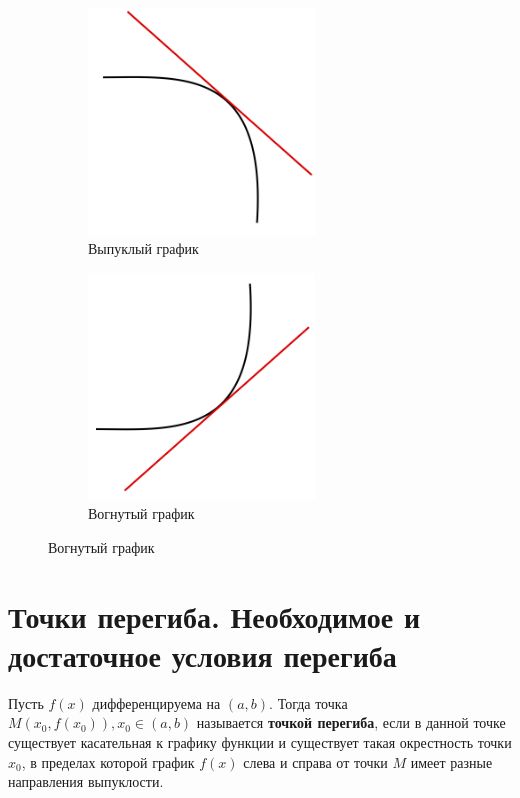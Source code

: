 \documentclass[a4paper,12pt,oneside]{extbook}
\theoremstyle{numbered}
\theoremstyle{unnumbered}
\theoremstyle{named}
\theoremstyle{unnumbered}
\theoremstyle{named}
\theoremstyle{named}
\theoremstyle{named}
\begin{document}
\begin{figure}[h]
    \begin{subfigure}{0.5\textwidth}
        \includegraphics[width=0.9\linewidth, height=6cm]{convex.png}
        \caption*{Выпуклый график}
    \end{subfigure}
    \begin{subfigure}{0.5\textwidth}
        \includegraphics[width=0.9\linewidth, height=6cm]{concave.png}
        \caption*{Вогнутый график}
    \end{subfigure}
\end{figure}

\section{Точки перегиба. Необходимое и достаточное условия перегиба}%
\label{sec:Точки перегиба. Необходимое и достаточное условия перегиба}

\begin{siderules}
    Пусть \(f(x)\) дифференцируема на \((a, b)\). Тогда точка \(M(x_0, f(x_0)), x_0 \in (a, b)\) называется \textbf{точкой перегиба}, если в данной точке существует касательная к графику функции и существует такая окрестность точки \(x_0\), в пределах которой график \(f(x)\) слева и справа от точки \(M\) имеет разные направления выпуклости.
\end{siderules}
\end{document}
